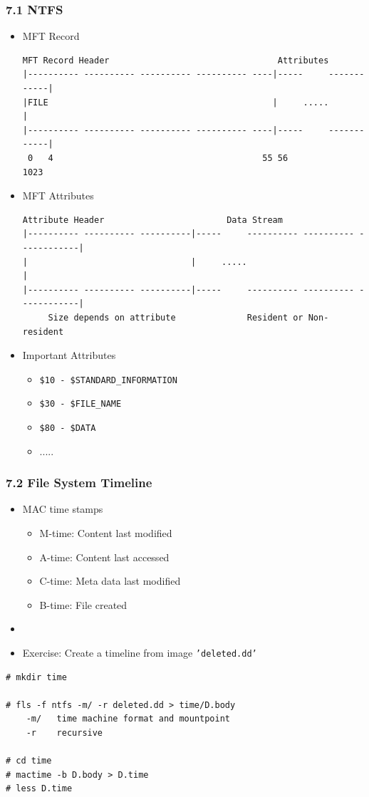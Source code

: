 \begin{frame}[fragile]
  \frametitle{7.1 NTFS}
    \begin{itemize}
	    \item MFT Record
  \begin{lstlisting}[basicstyle=\tiny]
      MFT Record Header                                 Attributes
|---------- ---------- ---------- ---------- ----|-----     ------------|
|FILE                                            |     .....            |
|---------- ---------- ---------- ---------- ----|-----     ------------|
 0   4                                         55 56                 1023
  \end{lstlisting}
    \item MFT Attributes
  \begin{lstlisting}[basicstyle=\tiny]
         Attribute Header                        Data Stream
|---------- ---------- ----------|-----     ---------- ---------- ------------|
|                                |     .....                                  |
|---------- ---------- ----------|-----     ---------- ---------- ------------|
     Size depends on attribute              Resident or Non-resident
  \end{lstlisting}
    \item Important Attributes
        \begin{itemize}
		\item \texttt{\$10 - \$STANDARD\_INFORMATION}
		\item \texttt{\$30 - \$FILE\_NAME}
		\item \texttt{\$80 - \$DATA}
		\item[] .....
        \end{itemize}
    \end{itemize}
\end{frame}


\begin{frame}[fragile]
  \frametitle{7.2 File System Timeline}
    \begin{itemize}
        \item MAC time stamps
            \begin{itemize}
                \item M-time: Content last modified
                \item A-time: Content last accessed
                \item C-time: Meta data last modified
                \item B-time: File created
            \end{itemize}
        \item[]
        \item[] Exercise: Create a timeline from image \texttt{'deleted.dd'}
    \end{itemize}
  \begin{lstlisting}[basicstyle=\tiny]
# mkdir time

# fls -f ntfs -m/ -r deleted.dd > time/D.body
	-m/   time machine format and mountpoint
	-r    recursive

# cd time
# mactime -b D.body > D.time
# less D.time
  \end{lstlisting}
\end{frame}


